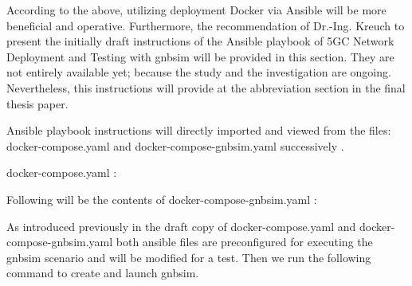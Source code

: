 
\lstset{style=mystyle}
  
  
  According to the above, utilizing deployment Docker via Ansible will be more beneficial and operative. Furthermore, the recommendation of Dr.-Ing. Kreuch to present the initially draft instructions of the Ansible playbook of 5GC Network Deployment and Testing with gnbsim will be provided in this section. They are not entirely available yet; because the study and the investigation are ongoing. Nevertheless, this instructions will provide at the abbreviation section in the final thesis paper.  
     
     
     
  Ansible playbook instructions will directly imported and viewed from the files:
  docker-compose.yaml and docker-compose-gnbsim.yaml successively  \cite{openairinterface2014}.
\clearpage


docker-compose.yaml \cite{openairinterface2014}:


\clearpage
Following will be the contents of docker-compose-gnbsim.yaml \cite{openairinterface2014}:



As introduced previously in the draft copy of docker-compose.yaml and docker-compose-gnbsim.yaml both ansible files are preconfigured for executing the gnbsim scenario and will be modified for a test. Then we run the following command to create and launch gnbsim. 
 




